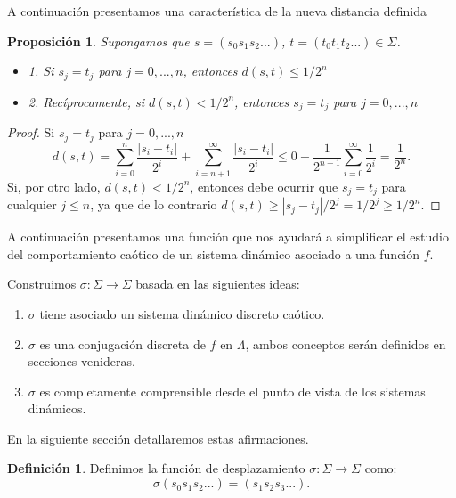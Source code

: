 \documentclass[12pt,a4paper]{report}
\newtheorem{proposicion}{Proposición}[section]
\theoremstyle{definition}
\newtheorem{definicion}{Definición}[section]
\begin{document}
A continuación presentamos una característica  de la nueva distancia definida

\begin{proposicion}
    
Supongamos que \(s=(s_{0}s_{1}s_{2}...)\), \(t=(t_{0}t_{1}t_{2}...)\in\Sigma\).
\begin{itemize}
    \item 1. Si \(s_{j}=t_{j}\) para \(j=0,...,n\), entonces \(d(s,t)\le1/2^{n}\)
    \item2. Recíprocamente, si \(d(s,t)<1/2^{n}\), entonces \(s_{j}=t_{j}\) para \(j=0,...,n\)
\end{itemize}

\end{proposicion}

\begin{proof}

Si \(s_{j}=t_{j}\) para \(j=0,...,n\)
\[
d(s,t)=\sum_{i=0}^{n}\frac{|s_{i}-t_{i}|}{2^{i}}+\sum_{i=n+1}^{\infty}\frac{|s_{i}-t_{i}|}{2^{i}}
\le0+\frac{1}{2^{n+1}}\sum_{i=0}^{\infty}\frac{1}{2^{i}} =\frac{1}{2^{n}}.
\]
%
Si, por otro lado, \(d(s,t)<1/2^{n}\), entonces debe ocurrir que \(s_{j}=t_{j}\) para cualquier \(j\le n\), ya que de lo contrario \(d(s,t)\ge|s_{j}-t_{j}|/2^{j}=1/2^{j}\ge1/2^{n}\).

\end{proof}


A continuación presentamos una función que nos ayudará a simplificar el estudio del comportamiento caótico de un sistema dinámico asociado a una función $f$.

Construimos \(\sigma:\Sigma\rightarrow\Sigma\) basada en las siguientes ideas:
\begin{enumerate}
    \item \(\sigma\) tiene asociado un sistema dinámico discreto caótico.
    \item  \(\sigma\) es una conjugación discreta de \(f\) en \(\Lambda\), ambos conceptos serán definidos en secciones venideras. 
    \item \(\sigma\) es completamente comprensible desde el punto de vista de los sistemas dinámicos.
\end{enumerate}

En la siguiente sección detallaremos estas afirmaciones.

\begin{definicion}
    
Definimos la función de desplazamiento \(\sigma:\Sigma\rightarrow\Sigma\) como:
\[
\sigma(s_{0}s_{1}s_{2}...)=(s_{1}s_{2}s_{3}...).
\]
%
\end{definicion}
\end{document}
